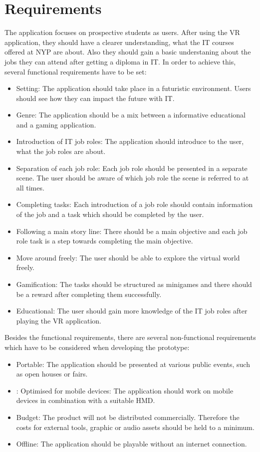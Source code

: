 \section{Requirements}
The application focuses on prospective students as users. After using the VR application, they should have a clearer understanding, what the IT courses offered at NYP are about. Also they should gain a basic understaning about the jobs they can attend after getting a diploma in IT. In order to achieve this, several functional requirements have to be set:\\
\begin{itemize}
\item Setting: The application should take place in a futuristic environment. Users should see how they can impact the future with IT.
\item Genre: The application should be a mix between a informative educational and a gaming application.
\item Introduction of IT job roles: The application should introduce to the user, what the job roles are about.
\item Separation of each job role: Each job role should be presented in a separate scene. The user should be aware of which job role the scene is referred to at all times.
\item Completing tasks: Each introduction of a job role should contain information of the job and a task which should be completed by the user.
\item Following a main story line: There should be a main objective and each job role task is a step towards completing the main objective.
\item Move around freely: The user should be able to explore the virtual world freely.
\item Gamification: The tasks should be structured as minigames and there should be a reward after completing them successfully.
\item Educational: The user should gain more knowledge of the IT job roles after playing the VR application.
\end{itemize}
Besides the functional requirements, there are several non-functional requirements which have to be considered when developing the prototype:
\begin{itemize}
\item Portable: The application should be presented at various public events, such as open houses or fairs.
\item: Optimised for mobile devices: The application should work on mobile devices in combination with a suitable HMD.
\item Budget: The product will not be distributed commercially. Therefore the costs for external tools, graphic or audio assets should be held to a minimum.
\item Offline: The application should be playable without an internet connection.
\end{itemize}
